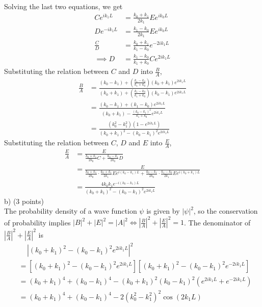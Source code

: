 \documentclass[12pt]{book} %
\numberwithin{equation}{chapter}
\def\iff{\Longleftrightarrow}
\begin{document}
\begin{solbox}
\begin{align*}
\end{align*}
Solving the last two equations, we get
\begin{align*}
Ce^{ik_{1}L}&=\frac{k_{0}+k_{1}}{2k_{1}}Ee^{ik_{0}L}\\
De^{-ik_{1}L}&=\frac{k_{1}-k_{0}}{2k_{1}}Ee^{ik_{0}L}\\
\frac{C}{D}&=\frac{k_{0}+k_{1}}{k_{1}-k_{0}}e^{-2ik_{1}L}\\
\implies D&=\frac{k_{1}-k_{0}}{k_{1}+k_{0}}Ce^{2ik_{1}L}
\end{align*}
Substituting the relation between $C$ and $D$ into $\frac{B}{A}$,
\begin{align*}
\frac{B}{A}&=\frac{(k_{0}-k_{1})+\left(\frac{k_{1}-k_{0}}{k_{1}+k_{0}}\right)(k_{0}+k_{1})e^{2ik_{1}L}}{(k_{0}+k_{1})+\left(\frac{k_{1}-k_{0}}{k_{1}+k_{0}}\right)(k_{0}-k_{1})e^{2ik_{1}L}}\\
&=\frac{(k_{0}-k_{1})+(k_{1}-k_{0})e^{2ik_{1}L}}{(k_{0}+k_{1})-\frac{\left(k_{0}-k_{1}\right)^{2}}{k_{1}+k_{0}}e^{2ik_{1}L}}\\
&=\frac{\left(k_{0}^{2}-k_{1}^{2}\right)\left(1-e^{2ik_{1}L}\right)}{\left(k_{0}+k_{1}\right)^{2}-\left(k_{0}-k_{1}\right)^{2}e^{2ik_{1}L}}
\end{align*}
Substituting the relation between $C$, $D$ and $E$ into $\frac{E}{A}$,
\begin{align*}
\frac{E}{A}&=\frac{E}{\frac{k_{0}+k_{1}}{2k_{0}}C+\frac{k_{0}-k_{1}}{2k_{0}}D}\\
&=\frac{E}{\frac{k_{0}+k_{1}}{2k_{0}}\cdot\frac{k_{0}+k_{1}}{2k_{1}}Ee^{i(k_{0}-k_{1})L}+\frac{k_{0}-k_{1}}{2k_{0}}\cdot\frac{k_{1}-k_{0}}{2k_{1}}Ee^{i(k_{0}+k_{1})L}}\\
&=\frac{4k_{0}k_{1}e^{-i\left(k_{0}-k_{1}\right)L}}{\left(k_{0}+k_{1}\right)^{2}-\left(k_{0}-k_{1}\right)^{2}e^{2ik_{1}L}}
\end{align*}
b) (3 points)\\
The probability density of a wave function $\psi$ is given by $\left|\psi\right|^{2}$, so the conservation of probability implies $\left|B\right|^{2}+\left|E\right|^{2}=\left|A\right|^{2}\iff \left|\frac{B}{A}\right|^{2}+\left|\frac{E}{A}\right|^{2}=1$.\bigskip\newline
The denominator of $\left|\frac{B}{A}\right|^{2}+\left|\frac{E}{A}\right|^{2}$ is
\begin{align*}
&\,\,\,\,\,\,\,\left|\left(k_{0}+k_{1}\right)^{2}-\left(k_{0}-k_{1}\right)^{2}e^{2ik_{1}L}\right|^{2}\\
&=\left[\left(k_{0}+k_{1}\right)^{2}-\left(k_{0}-k_{1}\right)^{2}e^{2ik_{1}L}\right]\left[\left(k_{0}+k_{1}\right)^{2}-\left(k_{0}-k_{1}\right)^{2}e^{-2ik_{1}L}\right]\\
&=\left(k_{0}+k_{1}\right)^{4}+\left(k_{0}-k_{1}\right)^{4}-\left(k_{0}+k_{1}\right)^{2}\left(k_{0}-k_{1}\right)^{2}\left(e^{2ik_{1}L}+e^{-2ik_{1}L}\right)\\
&=\left(k_{0}+k_{1}\right)^{4}+\left(k_{0}-k_{1}\right)^{4}-2\left(k_{0}^{2}-k_{1}^{2}\right)^{2}\cos\left(2k_{1}L\right)
\end{align*}


\end{solbox}
\end{document}
